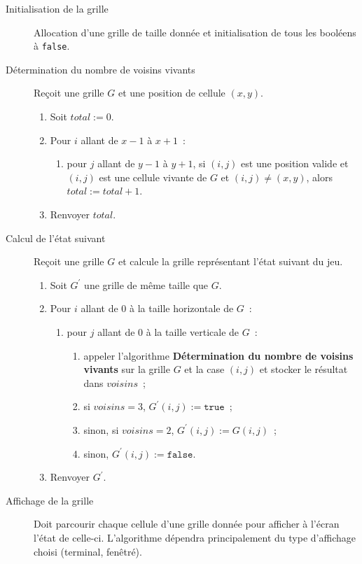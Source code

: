 \begin{description}
    \item[Initialisation de la grille] Allocation d'une grille de taille
    donnée et initialisation de tous les booléens à \texttt{false}.
    \item[Détermination du nombre de voisins vivants] Reçoit une grille $G$
    et une position de cellule $(x, y)$.
    \begin{enumerate}
        \item Soit $total := 0$.
        \item Pour $i$ allant de $x - 1$ à $x + 1$~:
        \begin{enumerate}
            \item pour $j$ allant de $y - 1$ à $y + 1$, si
            $(i, j)$ est une position valide et
            $(i, j)$ est une cellule vivante de $G$ et
            $(i, j) \neq (x, y)$, alors $total := total + 1$.
        \end{enumerate}
        \item Renvoyer $total$.
    \end{enumerate}
    \item[Calcul de l'état suivant] Reçoit une grille $G$ et calcule
    la grille représentant l'état suivant du jeu.
    \begin{enumerate}
        \item Soit $G^\prime$ une grille de même taille que $G$.
        \item Pour $i$ allant de $0$ à la taille horizontale de $G$~:
        \begin{enumerate}
            \item pour $j$ allant de $0$ à la taille verticale de $G$~:
            \begin{enumerate}
                \item appeler l'algorithme \textbf{Détermination du nombre de voisins vivants}
                sur la grille $G$ et la case $(i, j)$ et stocker le résultat dans $voisins$~;
                \item si $voisins = 3$, $G^\prime(i, j) := \mathtt{true}$~;
                \item sinon, si $voisins = 2$, $G^\prime(i, j) := G(i, j)$~;
                \item sinon, $G^\prime(i, j) := \mathtt{false}$.
            \end{enumerate}
        \end{enumerate}
        \item Renvoyer $G^\prime$.
    \end{enumerate}
    \item[Affichage de la grille] Doit parcourir chaque cellule
    d'une grille donnée pour afficher à l'écran l'état de celle-ci. L'algorithme
    dépendra principalement du type d'affichage choisi (terminal, fenêtré).
\end{description}

